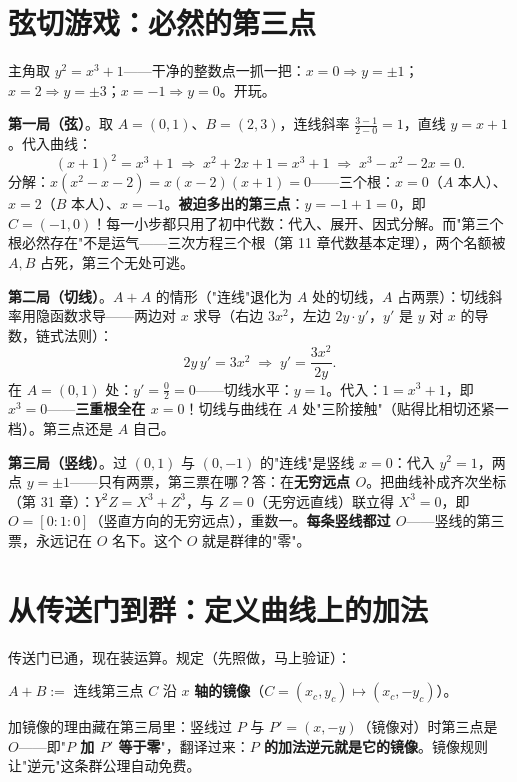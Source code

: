 \section{弦切游戏：必然的第三点}

主角取 $y^2 = x^3 + 1$——干净的整数点一抓一把：$x = 0 \Rightarrow y = \pm1$；$x = 2 \Rightarrow y = \pm3$；$x = -1 \Rightarrow y = 0$。开玩。

\textbf{第一局（弦）}。取 $A = (0,1)$、$B = (2,3)$，连线斜率 $\tfrac{3-1}{2-0} = 1$，直线 $y = x+1$。代入曲线：
\[
(x+1)^2 = x^3 + 1 \;\Longrightarrow\; x^2 + 2x + 1 = x^3 + 1 \;\Longrightarrow\; x^3 - x^2 - 2x = 0 .
\]
分解：$x(x^2 - x - 2) = x(x-2)(x+1) = 0$——三个根：$x = 0$（$A$ 本人）、$x = 2$（$B$ 本人）、$x = -1$。\textbf{被迫多出的第三点}：$y = -1 + 1 = 0$，即 $C = (-1, 0)$！每一小步都只用了初中代数：代入、展开、因式分解。而"第三个根必然存在"不是运气——三次方程三个根（第 11 章代数基本定理），两个名额被 $A,B$ 占死，第三个无处可逃。

\textbf{第二局（切线）}。$A + A$ 的情形（"连线"退化为 $A$ 处的切线，$A$ 占两票）：切线斜率用隐函数求导——两边对 $x$ 求导（右边 $3x^2$，左边 $2y\cdot y'$，$y'$ 是 $y$ 对 $x$ 的导数，链式法则）：
\[
2y\,y' = 3x^2 \;\Longrightarrow\; y' = \frac{3x^2}{2y} .
\]
在 $A = (0,1)$ 处：$y' = \tfrac{0}{2} = 0$——切线水平：$y = 1$。代入：$1 = x^3 + 1$，即 $x^3 = 0$——\textbf{三重根全在 $x = 0$}！切线与曲线在 $A$ 处"三阶接触"（贴得比相切还紧一档）。第三点还是 $A$ 自己。

\textbf{第三局（竖线）}。过 $(0,1)$ 与 $(0,-1)$ 的"连线"是竖线 $x = 0$：代入 $y^2 = 1$，两点 $y = \pm1$——只有两票，第三票在哪？答：在\textbf{无穷远点 $O$}。把曲线补成齐次坐标（第 31 章）：$Y^2Z = X^3 + Z^3$，与 $Z = 0$（无穷远直线）联立得 $X^3 = 0$，即 $O = [0:1:0]$（竖直方向的无穷远点），重数一。\textbf{每条竖线都过 $O$}——竖线的第三票，永远记在 $O$ 名下。这个 $O$ 就是群律的"零"。

\section{从传送门到群：定义曲线上的加法}

传送门已通，现在装运算。规定（先照做，马上验证）：
\begin{jielun}
$A + B := $ 连线第三点 $C$ 沿 $x$ \textbf{轴的镜像}（$C = (x_c, y_c) \mapsto (x_c, -y_c)$）。
\end{jielun}
加镜像的理由藏在第三局里：竖线过 $P$ 与 $P' = (x,-y)$（镜像对）时第三点是 $O$——即"\textbf{$P$ 加 $P'$ 等于零}"，翻译过来：\textbf{$P$ 的加法逆元就是它的镜像}。镜像规则让"逆元"这条群公理自动免费。

